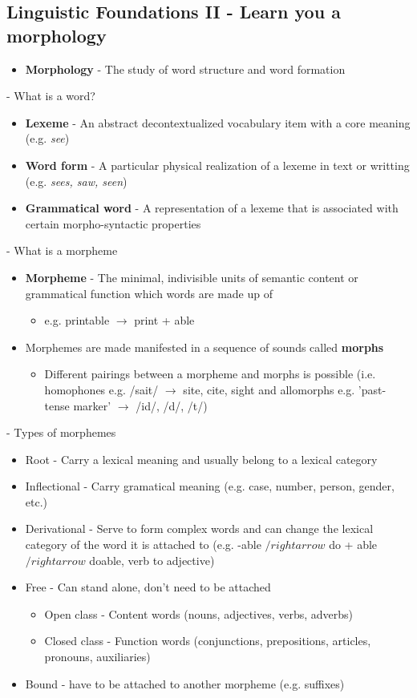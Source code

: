 \documentclass[11pt]{article}
\newenvironment{itemise}{
\begin{itemize}
  \setlength{\itemsep}{1pt}
  \setlength{\parskip}{0pt}
  \setlength{\parsep}{0pt}
}{\end{itemize}}
\begin{document}
\subsection{Linguistic Foundations II - Learn you a morphology}
\begin{itemise}
 \item \textbf{Morphology} - The study of word structure and word formation
\end{itemise}

- What is a word?
\begin{itemise}
 \item \textbf{Lexeme} - An abstract decontextualized vocabulary item with a core meaning (e.g. {\it see})
 \item \textbf{Word form} - A particular physical realization of a lexeme in text or writting (e.g. {\it sees, saw, seen}) 
 \item \textbf{Grammatical word} - A representation of a lexeme that is associated with certain morpho-syntactic properties
\end{itemise}
- What is a morpheme
\begin{itemise}
 \item {\bf Morpheme} - The minimal, indivisible units of semantic content or grammatical function which words are made up of
  \begin{itemise}
   \item e.g. printable $\rightarrow$ print + able
  \end{itemise}
  \item Morphemes are made manifested in a sequence of sounds called {\bf morphs}
  \begin{itemise}
    \item Different pairings between a morpheme and morphs is possible (i.e. homophones e.g. /sait/ $\rightarrow$ site, cite, sight and allomorphs e.g. 'past-tense marker' $\rightarrow$ /id/, /d/, /t/)  
  \end{itemise}
\end{itemise}
- Types of morphemes
\begin{itemise}
 \item Root - Carry a lexical meaning and usually belong to a lexical category
 \item Inflectional - Carry gramatical meaning (e.g. case, number, person, gender, etc.)
 \item Derivational - Serve to form complex words and can change the lexical category of the word it is attached to (e.g. -able $/rightarrow$ do + able $/rightarrow$ doable, verb to adjective)
 \item Free - Can stand alone, don't need to be attached
  \begin{itemise}
    \item Open class - Content words (nouns, adjectives, verbs, adverbs)
    \item Closed class - Function words  (conjunctions, prepositions, articles, pronouns, auxiliaries)
  \end{itemise}
 \item Bound - have to be attached to another morpheme (e.g. suffixes)
\end{itemise}
\end{document}
